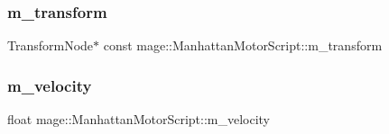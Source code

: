 \subsubsection{\texorpdfstring{m\+\_\+transform}{m\_transform}}
{\footnotesize\ttfamily Transform\+Node$\ast$ const mage\+::\+Manhattan\+Motor\+Script\+::m\+\_\+transform\hspace{0.3cm}{\ttfamily [private]}}

\hypertarget{classmage_1_1_manhattan_motor_script_a824893c374fa6f271a964751dc1a59ec}{}\label{classmage_1_1_manhattan_motor_script_a824893c374fa6f271a964751dc1a59ec} 
\subsubsection{\texorpdfstring{m\+\_\+velocity}{m\_velocity}}
{\footnotesize\ttfamily float mage\+::\+Manhattan\+Motor\+Script\+::m\+\_\+velocity\hspace{0.3cm}{\ttfamily [private]}}

